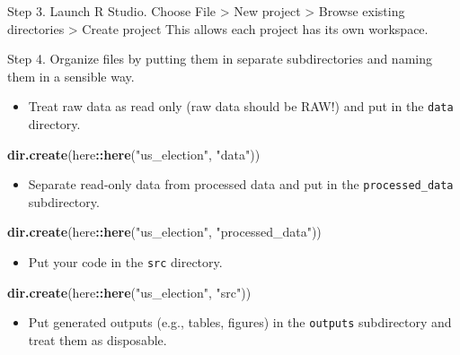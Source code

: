 \documentclass[
]{book}
\newenvironment{Shaded}{\begin{snugshade}}{\end{snugshade}}
\newcommand{\KeywordTok}[1]{\textcolor[rgb]{0.13,0.29,0.53}{\textbf{#1}}}
\newcommand{\NormalTok}[1]{#1}
\newcommand{\OperatorTok}[1]{\textcolor[rgb]{0.81,0.36,0.00}{\textbf{#1}}}
\newcommand{\StringTok}[1]{\textcolor[rgb]{0.31,0.60,0.02}{#1}}
\providecommand{\tightlist}{%
  \setlength{\itemsep}{0pt}\setlength{\parskip}{0pt}}
\begin{document}
Step 3. Launch R Studio. Choose File \textgreater{} New project \textgreater{} Browse existing directories \textgreater{} Create project This allows each project has its own workspace.

Step 4. Organize files by putting them in separate subdirectories and naming them in a sensible way.

\begin{itemize}
\tightlist
\item
  Treat raw data as read only (raw data should be RAW!) and put in the \texttt{data} directory.
\end{itemize}

\begin{Shaded}
\begin{Highlighting}[]
\KeywordTok{dir.create}\NormalTok{(here}\OperatorTok{::}\KeywordTok{here}\NormalTok{(}\StringTok{"us\_election"}\NormalTok{, }\StringTok{"data"}\NormalTok{))}
\end{Highlighting}
\end{Shaded}

\begin{itemize}
\tightlist
\item
  Separate read-only data from processed data and put in the \texttt{processed\_data} subdirectory.
\end{itemize}

\begin{Shaded}
\begin{Highlighting}[]
\KeywordTok{dir.create}\NormalTok{(here}\OperatorTok{::}\KeywordTok{here}\NormalTok{(}\StringTok{"us\_election"}\NormalTok{, }\StringTok{"processed\_data"}\NormalTok{))}
\end{Highlighting}
\end{Shaded}

\begin{itemize}
\tightlist
\item
  Put your code in the \texttt{src} directory.
\end{itemize}

\begin{Shaded}
\begin{Highlighting}[]
\KeywordTok{dir.create}\NormalTok{(here}\OperatorTok{::}\KeywordTok{here}\NormalTok{(}\StringTok{"us\_election"}\NormalTok{, }\StringTok{"src"}\NormalTok{))}
\end{Highlighting}
\end{Shaded}

\begin{itemize}
\tightlist
\item
  Put generated outputs (e.g., tables, figures) in the \texttt{outputs} subdirectory and treat them as disposable.
\end{itemize}
\end{document}
